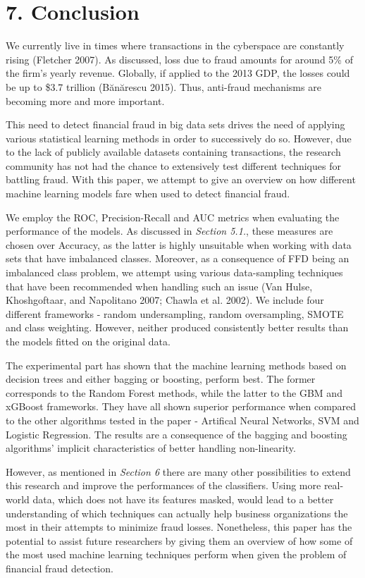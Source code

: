 \documentclass[12pt,]{article}
\begin{document}
\hypertarget{conclusion}{%
\section{7. Conclusion}\label{conclusion}}

We currently live in times where transactions in the cyberspace are
constantly rising (Fletcher 2007). As discussed, loss due to fraud
amounts for around 5\% of the firm's yearly revenue. Globally, if
applied to the 2013 GDP, the losses could be up to \$3.7 trillion
(Bănărescu 2015). Thus, anti-fraud mechanisms are becoming more and more
important.

This need to detect financial fraud in big data sets drives the need of
applying various statistical learning methods in order to successively
do so. However, due to the lack of publicly available datasets
containing transactions, the research community has not had the chance
to extensively test different techniques for battling fraud. With this
paper, we attempt to give an overview on how different machine learning
models fare when used to detect financial fraud.

We employ the ROC, Precision-Recall and AUC metrics when evaluating the
performance of the models. As discussed in \emph{Section 5.1.}, these
measures are chosen over Accuracy, as the latter is highly unsuitable
when working with data sets that have imbalanced classes. Moreover, as a
consequence of FFD being an imbalanced class problem, we attempt using
various data-sampling techniques that have been recommended when
handling such an issue (Van Hulse, Khoshgoftaar, and Napolitano 2007;
Chawla et al. 2002). We include four different frameworks - random
undersampling, random oversampling, SMOTE and class weighting. However,
neither produced consistently better results than the models fitted on
the original data.

The experimental part has shown that the machine learning methods based
on decision trees and either bagging or boosting, perform best. The
former corresponds to the Random Forest methods, while the latter to the
GBM and xGBoost frameworks. They have all shown superior performance
when compared to the other algorithms tested in the paper - Artifical
Neural Networks, SVM and Logistic Regression. The results are a
consequence of the bagging and boosting algorithms' implicit
characteristics of better handling non-linearity.

However, as mentioned in \emph{Section 6} there are many other
possibilities to extend this research and improve the performances of
the classifiers. Using more real-world data, which does not have its
features masked, would lead to a better understanding of which
techniques can actually help business organizations the most in their
attempts to minimize fraud losses. Nonetheless, this paper has the
potential to assist future researchers by giving them an overview of how
some of the most used machine learning techniques perform when given the
problem of financial fraud detection.
\end{document}
